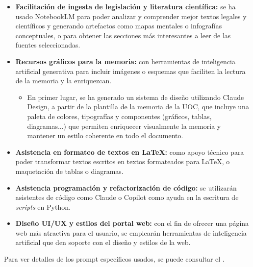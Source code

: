\begin{itemize}
    \item \textbf{Facilitación de ingesta de legislación y literatura científica:} se ha usado NotebookLM para poder analizar y comprender mejor textos legales y científicos y generando artefactos como mapas mentales o infografías conceptuales, o para obtener las secciones más interesantes a leer de las fuentes seleccionadas.
    \item \textbf{Recursos gráficos para la memoria:} con herramientas de inteligencia artificial generativa para incluir imágenes o esquemas que faciliten la lectura de la memoria y la enriquezcan.
    \begin{itemize}
        \item En primer lugar, se ha generado un sistema de diseño utilizando Claude Design, a partir de la plantilla de la memoria de la UOC, que incluye una paleta de colores, tipografías y componentes (gráficos, tablas, diagramas...) que permiten enriquecer visualmente la memoria y mantener un estilo coherente en todo el documento.
    \end{itemize}
    \item \textbf{Asistencia en formateo de textos en LaTeX:} como apoyo técnico para poder transformar textos escritos en textos formateados para LaTeX, o maquetación de tablas o diagramas.
    \item \textbf{Asistencia programación y refactorización de código:} se utilizarán asistentes de código como Claude o Copilot como ayuda en la escritura de \textit{scripts} en Python.
    \item \textbf{Diseño UI/UX y estilos del portal web:} con el fin de ofrecer una página web más atractiva para el usuario, se emplearán herramientas de inteligencia artificial que den soporte con el diseño y estilos de la web.
\end{itemize}

Para ver detalles de los prompt específicos usados, se puede consultar el .